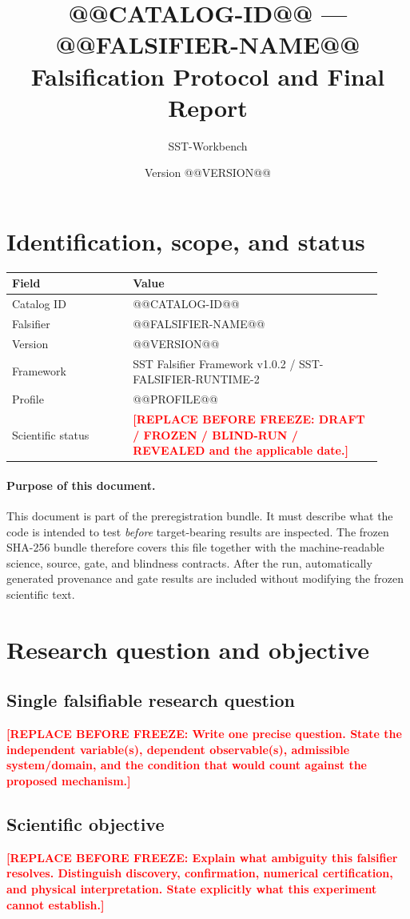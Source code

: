 \documentclass[11pt,a4paper]{article}
\title{@@CATALOG-ID@@ --- @@FALSIFIER-NAME@@\\Falsification Protocol and Final Report}
\author{SST-Workbench}
\date{Version @@VERSION@@}
\newcommand{\SSTTODO}[1]{\ifmmode\text{\color{red}\bfseries TODO}\else\textcolor{red}{\textbf{[REPLACE BEFORE FREEZE: #1]}}\fi}
\begin{document}
\maketitle

\section{Identification, scope, and status}
\begin{longtable}{p{0.30\linewidth}p{0.62\linewidth}}
\toprule
Field & Value \\
\midrule
Catalog ID & @@CATALOG-ID@@ \\
Falsifier & @@FALSIFIER-NAME@@ \\
Version & @@VERSION@@ \\
Framework & SST Falsifier Framework v1.0.2 / SST-FALSIFIER-RUNTIME-2 \\
Profile & @@PROFILE@@ \\
Scientific status & \SSTTODO{DRAFT / FROZEN / BLIND-RUN / REVEALED and the applicable date.} \\
\bottomrule
\end{longtable}

\paragraph{Purpose of this document.}
This document is part of the preregistration bundle. It must describe what the code is intended to test \emph{before} target-bearing results are inspected. The frozen SHA-256 bundle therefore covers this file together with the machine-readable science, source, gate, and blindness contracts. After the run, automatically generated provenance and gate results are included without modifying the frozen scientific text.

\section{Research question and objective}
\subsection{Single falsifiable research question}
\SSTTODO{Write one precise question. State the independent variable(s), dependent observable(s), admissible system/domain, and the condition that would count against the proposed mechanism.}

\subsection{Scientific objective}
\SSTTODO{Explain what ambiguity this falsifier resolves. Distinguish discovery, confirmation, numerical certification, and physical interpretation. State explicitly what this experiment cannot establish.}
\end{document}
